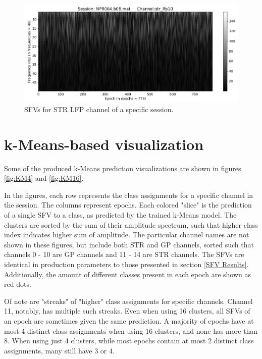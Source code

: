 \documentclass{kththesis}
\begin{document}
\begin{figure}[H]
    \centering
    \centerline{\includegraphics[width=1.1\textwidth]{images/STR2.png}}
    \caption{SFVs for STR LFP channel of a specific session.}
    \label{fig:STR2}
\end{figure}

\section{k-Means-based visualization}\label{KM Results}

Some of the produced k-Means prediction visualizations are shown in figures \ref{fig:KM4} and \ref{fig:KM16}.

In the figures, each row represents the class assignments for a specific channel in the session.
The columns represent epochs.
Each colored "slice" is the prediction of a single SFV to a class, as predicted by the trained k-Means model.
The clusters are sorted by the sum of their amplitude spectrum, such that higher class index indicates higher sum of amplitude.
The particular channel names are not shown in these figures, but include both STR and GP channels, sorted such that channels 0 - 10 are GP channels and 11 - 14 are STR channels.
The SFVs are identical in production parameters to those presented in section \ref{SFV Results}.
Additionally, the amount of different classes present in each epoch are shown as red dots.

Of note are "streaks" of "higher" class assignments for specific channels.
Channel 11, notably, has multiple such streaks.
Even when using 16 clusters, all SFVs of an epoch are sometimes given the same prediction.
A majority of epochs have at most 4 distinct class assignments when using 16 clusters, and none has more than 8. 
When using just 4 clusters, while most epochs contain at most 2 distinct class assignments, many still have 3 or 4.
\end{document}
